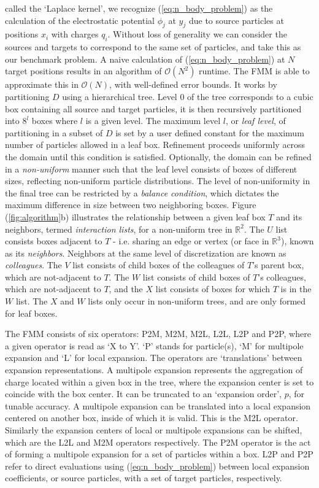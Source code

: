 \documentclass{IEEEcsmag}
\begin{document}
called the `Laplace kernel', we recognize (\ref{eq:n_body_problem}) as the calculation of the electrostatic potential $\phi_j$ at $y_j$ due to source particles at positions $x_i$ with charges $q_i$. Without loss of generality we can consider the sources and targets to correspond to the same set of particles, and take this as our benchmark problem. A naive calculation of (\ref{eq:n_body_problem}) at $N$ target positions results in an algorithm of $\mathcal{O}(N^2)$ runtime. The FMM is able to approximate this in $\mathcal{O}(N)$, with well-defined error bounds. It works by partitioning $D$ using a hierarchical tree. Level $0$ of the tree corresponds to a cubic box containing all source and target particles, it is then recursively partitioned into $8^l$ boxes where $l$ is a given level. The maximum level $l$, or \textit{leaf level}, of partitioning in a subset of $D$ is set by a user defined constant for the maximum number of particles allowed in a leaf box. Refinement proceeds uniformly across the domain until this condition is satisfied. Optionally, the domain can be refined in a \textit{non-uniform} manner such that the leaf level consists of boxes of different sizes, reflecting non-uniform particle distributions. The level of non-uniformity in the final tree can be restricted by a \textit{balance condition}, which dictates the maximum difference in size between two neighboring boxes. Figure (\ref{fig:algorithm}b) illustrates the relationship between a given leaf box $T$ and its neighbors, termed \textit{interaction lists}, for a non-uniform tree in $\mathbb{R}^2$. The $U$ list consists boxes adjacent to $T$ - i.e. sharing an edge or vertex (or face in $\mathbb{R}^3$), known as its \textit{neighbors}. Neighbors at the same level of discretization are known as \textit{colleagues}.  The $V$ list consists of child boxes of the colleagues of $T$'s parent box, which are not-adjacent to $T$. The $W$ list consists of child boxes of $T$'s colleagues, which are not-adjacent to $T$, and the $X$ list consists of boxes for which $T$ is in the $W$ list. The $X$ and $W$ lists only occur in non-uniform trees, and are only formed for leaf boxes.

The FMM consists of six operators: P2M, M2M, M2L, L2L, L2P and P2P, where a given operator is read as `X to Y'. `P' stands for particle(s), `M' for multipole expansion and `L' for local expansion. The operators are `translations' between expansion representations. A multipole expansion represents the aggregation of charge located within a given box in the tree, where the expansion center is set to coincide with the box center. It can be truncated to an `expansion order', $p$, for tunable accuracy. A multipole expansion can be translated into a local expansion centered on another box, inside of which it is valid. This is the M2L operator. Similarly the expansion centers of local or multipole expansions can be shifted, which are the L2L and M2M operators respectively. The P2M operator is the act of forming a multipole expansion for a set of particles within a box. L2P and P2P refer to direct evaluations using (\ref{eq:n_body_problem}) between local expansion coefficients, or source particles, with a set of target particles, respectively.
\end{document}
